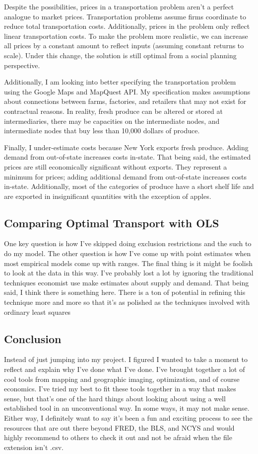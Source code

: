 \documentclass{report}
\begin{document}
Despite the possibilities, prices in a transportation problem aren't a perfect analogue to market prices. Transportation problems assume firms coordinate to reduce total transportation costs. Additionally, prices in the problem only reflect linear transportation costs. To make the problem more realistic, we can increase all prices by a constant amount to reflect inputs (assuming constant returns to scale). Under this change, the solution is still optimal from a social planning perspective. 

Additionally, I am looking into better specifying the transportation problem using the Google Maps and MapQuest API.  My specification makes assumptions about connections between farms, factories, and retailers that may not exist for contractual reasons. In reality, fresh produce can be altered or stored at intermediaries, there may be capacities on the intermediate nodes, and intermediate nodes that buy less than 10,000 dollars of produce. 

Finally, I under-estimate costs because New York exports fresh produce. Adding demand from out-of-state increases costs in-state.  That being said, the estimated prices are still economically significant without exports. They represent a minimum for prices; adding additional demand from out-of-state increases costs in-state. Additionally, most of the categories of produce have a short shelf life and are exported in insignificant quantities with the exception of apples.


\subsection{Comparing Optimal Transport with OLS}

One key question is how I've skipped doing exclusion restrictions and the such to do my model. The other question is how I've come up with point estimates when most empirical models come up with ranges. The final thing is it might be foolish to look at the data in this way. I've probably lost a lot by ignoring the traditional techniques economist use make estimates about supply and demand. That being said, I think there is something here. There is a ton of potential in refining this technique more and more so that it's as polished as the techniques involved with ordinary least squares


\subsection{Conclusion}
Instead of just jumping into my project. I figured I wanted to take a moment to reflect and explain why I've done what I've done. I've brought together a lot of cool tools from mapping and geographic imaging, optimization, and of course economics. I've tried my best to fit these tools together in a way that makes sense, but that's one of the hard things about looking about using a well established tool in an unconventional way. In some ways, it may not make sense. Either way, I definitely want to say it's been a fun and exciting process to see the resources that are out there beyond FRED, the BLS, and NCYS and would highly recommend to others to check it out and not be afraid when the file extension isn't .csv.
\end{document}
